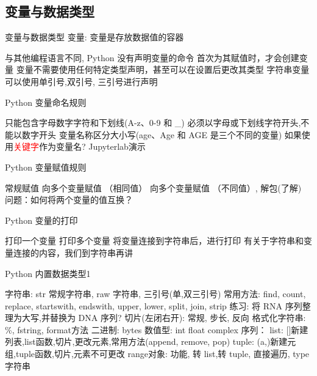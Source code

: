 \subsection{变量与数据类型}

\begin{frame}{变量与数据类型}
    变量: 变量是存放数据值的容器
    \begin{myoutline}
        \1 与其他编程语言不同, Python 没有声明变量的命令
        \1 首次为其赋值时，才会创建变量
        \1 变量不需要使用任何特定类型声明，甚至可以在设置后更改其类型
        \1 字符串变量可以使用单引号,双引号, 三引号进行声明
    \end{myoutline}
\end{frame}

\begin{frame}{Python 变量命名规则}
    \begin{myoutline}
        \1 只能包含字母数字字符和下划线(A-z、0-9 和 \_)
        \1 必须以字母或下划线字符开头,不能以数字开头
        \1 变量名称区分大小写(age、Age 和 AGE 是三个不同的变量)
        \1 如果使用\textcolor{red}{关键字}作为变量名?
        \1 Jupyterlab演示
    \end{myoutline}
\end{frame}

\begin{frame}{Python 变量赋值规则}
    \begin{myoutline}
        \1 常规赋值
        \1 向多个变量赋值 （相同值）
        \1 向多个变量赋值 （不同值）, 解包(了解)
        \1 问题：如何将两个变量的值互换？
    \end{myoutline}
\end{frame}

\begin{frame}{Python 变量的打印}
    \begin{myoutline}
        \1 打印一个变量
        \1 打印多个变量
        \1 将变量连接到字符串后，进行打印
            \2 有关于字符串和变量连接的内容，我们到字符串再讲
    \end{myoutline}
\end{frame}

\begin{frame}{Python 内置数据类型1}
    \begin{myoutline}
        \1 字符串: str
            \2 常规字符串, raw 字符串, 三引号(单,双三引号)
            \2 常用方法: find, count, replace, startswith, endswith, upper, lower, split, join, strip
            \2 练习: 将 RNA 序列整理为大写,并替换为 DNA 序列?
            \2 切片(左闭右开): 常规, 步长, 反向
            \2 格式化字符串: \%, fstring, format方法
        \1 二进制: bytes
        \1 数值型: 
            \2 int
            \2 float
            \2 complex
        \1 序列：
            \2 list: []新建列表,list函数,切片,更改元素,常用方法(append, remove, pop)
            \2 tuple: (a,)新建元组,tuple函数,切片,元素不可更改
            \2 range对象: 功能, 转 list,转 tuple, 直接遍历, type
            \2 字符串
    \end{myoutline}
\end{frame}

